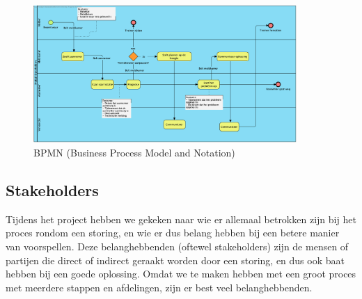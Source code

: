 \documentclass{article}
\begin{document}
\begin{figure}[H]
    \centering
    \includegraphics[width=10cm]{bpmn.png}
    \caption{BPMN (Business Process Model and Notation)}
\end{figure}

\subsection{Stakeholders}
Tijdens het project hebben we gekeken naar wie er allemaal betrokken zijn bij het proces rondom een storing, en wie er dus belang hebben bij een betere manier van voorspellen. Deze belanghebbenden (oftewel stakeholders) zijn de mensen of partijen die direct of indirect geraakt worden door een storing, en dus ook baat hebben bij een goede oplossing. Omdat we te maken hebben met een groot proces met meerdere stappen en afdelingen, zijn er best veel belanghebbenden.
\end{document}
